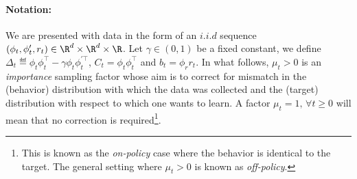 \paragraph{Notation:} We are presented with data in the form of an $i.i.d$ sequence $(\phi_t,\phi'_t,r_t)\in \R^d\times\R^d\times \R$. Let $\gamma \in (0,1)$ be a fixed constant, we define $\Delta_t\eqdef \phi_t\phi_t^\top-\gamma \phi_t\phi_t^{'\top}$, $C_t=\phi_t\phi_t^\top$ and $b_t=\phi_r r_t$. In what follows, $\mu_t>0$ is an \emph{importance} sampling factor whose aim is to correct for mismatch in the (behavior) distribution with which the data was collected and the (target) distribution with respect to which one wants to learn. A factor $\mu_t=1,\,\forall t\geq 0$ will mean that no correction is required\footnote{This is known as the \emph{on-policy} case where the behavior is identical to the target. The general setting where $\mu_t>0$ is known as \emph{off-policy}.}.
\FloatBarrier
\begin{table}[h]
\label{tb:rates}
\caption{Some popular TD algorithms with rates known in literature \cite{korda-prashanth,gtd2,gtdmp}. }
\end{table}
